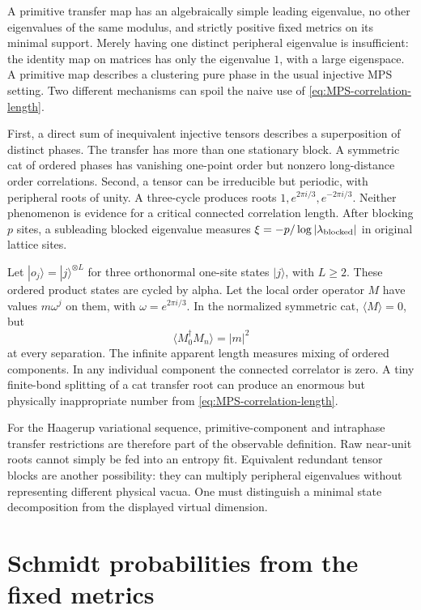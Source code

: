 A primitive transfer map has an algebraically simple leading
eigenvalue, no other eigenvalues of the same modulus, and strictly
positive fixed metrics on its minimal support. Merely having one
distinct peripheral eigenvalue is insufficient: the identity map
on matrices has only the eigenvalue $1$, with a large eigenspace.
A primitive map describes
a clustering pure phase in the usual injective MPS setting. Two
different mechanisms can spoil the naive use of
\eqref{eq:MPS-correlation-length}.

First, a direct sum of inequivalent injective tensors describes a
superposition of distinct phases. The transfer has more than one
stationary block. A symmetric cat of ordered phases has vanishing
one-point order but nonzero long-distance order correlations. Second,
a tensor can be irreducible but periodic, with peripheral roots of
unity. A three-cycle produces roots $1,e^{2\pi i/3},e^{-2\pi i/3}$.
Neither phenomenon is evidence for a critical connected correlation
length.
After blocking $p$ sites, a subleading blocked eigenvalue measures
$\xi=-p/\log|\lambda_{\rm blocked}|$ in original lattice sites.

\begin{example}
Let $|o_j\rangle=|j\rangle^{\otimes L}$ for three orthonormal
one-site states $|j\rangle$, with $L\ge2$. These ordered product
states are cycled by alpha. Let the local order operator $M$ have
values $m\omega^j$ on them, with
$\omega=e^{2\pi i/3}$. In the normalized symmetric cat,
$\langle M\rangle=0$, but
\[
 \langle M_0^\dagger M_n\rangle=|m|^2
\]
at every separation. The infinite apparent length measures mixing of
ordered components. In any individual component the connected
correlator is zero. A tiny finite-bond splitting of a cat transfer
root can produce an enormous but physically inappropriate number
from \eqref{eq:MPS-correlation-length}.
\end{example}

For the Haagerup variational sequence, primitive-component and
intraphase transfer restrictions are therefore part of the observable
definition. Raw near-unit roots cannot simply be fed into an entropy
fit. Equivalent redundant tensor blocks are another possibility: they
can multiply peripheral eigenvalues without representing different
physical vacua. One must distinguish a minimal state decomposition
from the displayed virtual dimension.

\section{Schmidt probabilities from the fixed metrics}

